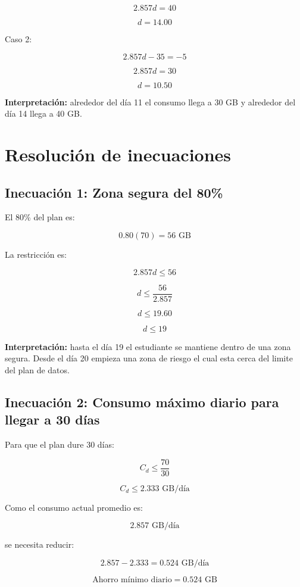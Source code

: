 \documentclass[12pt,a4paper]{article}
\begin{document}
	\[
	2.857d=40
	\]
	
	\[
	d=14.00
	\]
	
	Caso 2:
	
	\[
	2.857d-35=-5
	\]
	
	\[
	2.857d=30
	\]
	
	\[
	d=10.50
	\]
	
	\textbf{Interpretación:} alrededor del día 11 el consumo llega a 30 GB y alrededor del día 14 llega a 40 GB.
	
	\section{Resolución de inecuaciones}
	
	\subsection{Inecuación 1: Zona segura del 80\%}
	
	El 80\% del plan es:
	
	\[
	0.80(70)=56\text{ GB}
	\]
	
	La restricción es:
	
	\[
	2.857d\leq56
	\]
	
	\[
	d\leq\frac{56}{2.857}
	\]
	
	\[
	d\leq19.60
	\]
	
	\[
	\boxed{d\leq19}
	\]
	
	\textbf{Interpretación:} hasta el día 19 el estudiante se mantiene dentro de una zona segura. Desde el día 20 empieza una zona de riesgo el cual esta cerca del limite del plan de datos.
	
	\subsection{Inecuación 2: Consumo máximo diario para llegar a 30 días}
	
	Para que el plan dure 30 días:
	
	\[
	C_d\leq\frac{70}{30}
	\]
	
	\[
	C_d\leq2.333\text{ GB/día}
	\]
	
	Como el consumo actual promedio es:
	
	\[
	2.857\text{ GB/día}
	\]
	
	se necesita reducir:
	
	\[
	2.857-2.333=0.524\text{ GB/día}
	\]
	
	\[
	\boxed{\text{Ahorro mínimo diario}=0.524\text{ GB}}
	\]
	
\end{document}

